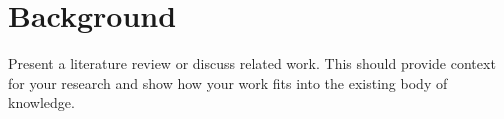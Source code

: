 \section{Background}
Present a literature review or discuss related work. This should provide context for your research and show how your work fits into the existing body of knowledge.